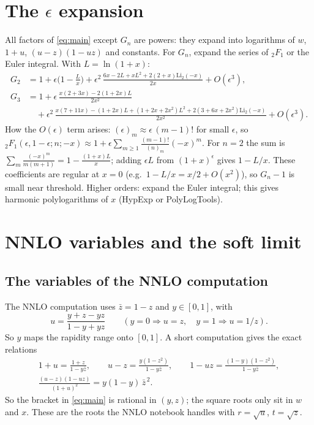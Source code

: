 \documentclass[11pt,a4paper]{article}
\newcommand{\ep}{\epsilon}
\newcommand{\zb}{\bar z}
\newcommand{\Li}{\mathrm{Li}_2}
\newcommand{\F}{{}_2F_1}
\begin{document}
\section{\texorpdfstring{The $\ep$ expansion}{The epsilon expansion}}
\label{sec:eps}
All factors of \eqref{eq:main} except $G_n$ are powers: they expand into logarithms of $w$, $1+u$,
$(u-z)(1-uz)$ and constants. For $G_n$, expand the series of $\F$ or the Euler integral. With $L=\ln(1+x)$:
\begin{align}
G_2&=1+\ep\Big(1-\frac Lx\Big)+\ep^2\,\frac{6x-2L+xL^2+2(2+x)\Li(-x)}{2x}+O(\ep^3),\\
G_3&=1+\ep\,\frac{x(2+3x)-2(1+2x)L}{2x^2}\nonumber\\
 &\quad+\ep^2\,\frac{x(7+11x)-(1+2x)L+(1+2x+2x^2)L^2+2(3+6x+2x^2)\Li(-x)}{2x^2}+O(\ep^3).
\end{align}
How the $O(\ep)$ term arises: $(\ep)_m\approx\ep\,(m-1)!$ for small $\ep$, so
$\F(\ep,1-\ep;n;-x)\approx1+\ep\sum_{m\ge1}\frac{(m-1)!}{(n)_m}(-x)^m$. For $n=2$ the sum is
$\sum_m\frac{(-x)^m}{m(m+1)}=1-\frac{(1+x)L}{x}$; adding $\ep L$ from $(1+x)^\ep$ gives $1-L/x$. These
coefficients are regular at $x=0$ (e.g.\ $1-L/x=x/2+O(x^2)$), so $G_n-1$ is small near threshold.
Higher orders: expand the Euler integral; this gives harmonic polylogarithms of $x$ (HypExp or PolyLogTools).

\section{NNLO variables and the soft limit}
\label{sec:soft}
\subsection{The variables of the NNLO computation}
The NNLO computation uses $\zb=1-z$ and $y\in[0,1]$, with
\[ u=\frac{y+z-yz}{1-y+yz}\qquad(y=0\Rightarrow u=z,\quad y=1\Rightarrow u=1/z). \]
So $y$ maps the rapidity range onto $[0,1]$. A short computation gives the exact relations
\begin{gather}
  1+u=\frac{1+z}{1-y\zb},\qquad u-z=\frac{y(1-z^2)}{1-y\zb},\qquad 1-uz=\frac{(1-y)(1-z^2)}{1-y\zb},\nonumber\\
  \frac{(u-z)(1-uz)}{(1+u)^2}=y(1-y)\,\zb^{\,2}.
\end{gather}
So the bracket in \eqref{eq:main} is rational in $(y,z)$; the square roots only sit in $w$ and $x$. These are
the roots the NNLO notebook handles with $r=\sqrt u$, $t=\sqrt z$.
\end{document}
